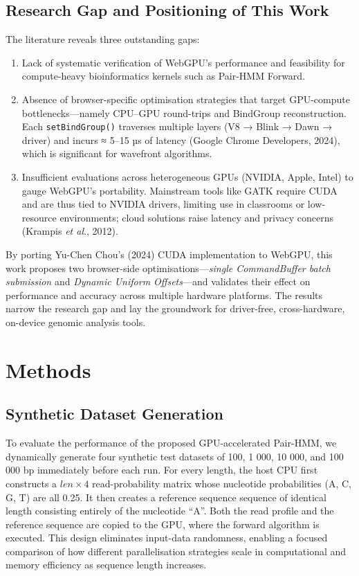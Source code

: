 \documentclass[PhD]{PHlab-thesis}
\begin{document}
\section{Research Gap and Positioning of This Work}
The literature reveals three outstanding gaps:

\begin{enumerate}
  \item Lack of systematic verification of WebGPU's performance and feasibility for compute-heavy bioinformatics kernels such as Pair-HMM Forward.
  \item Absence of browser-specific optimisation strategies that target GPU-compute bottlenecks—namely CPU–GPU round-trips and BindGroup reconstruction. Each \verb|setBindGroup()| traverses multiple layers (V8 → Blink → Dawn → driver) and incurs ≈ 5–15 µs of latency (Google Chrome Developers, 2024), which is significant for wavefront algorithms.
  \item Insufficient evaluations across heterogeneous GPUs (NVIDIA, Apple, Intel) to gauge WebGPU's portability. Mainstream tools like GATK require CUDA and are thus tied to NVIDIA drivers, limiting use in classrooms or low-resource environments; cloud solutions raise latency and privacy concerns (Krampis \emph{et al}., 2012).
\end{enumerate}

By porting Yu-Chen Chou's (2024) CUDA implementation to WebGPU, this work proposes two browser-side optimisations—\emph{single CommandBuffer batch submission} and \emph{Dynamic Uniform Offsets}—and validates their effect on performance and accuracy across multiple hardware platforms. The results narrow the research gap and lay the groundwork for driver-free, cross-hardware, on-device genomic analysis tools.





\chapter{Methods}

\section{Synthetic Dataset Generation}\label{sec:dataset}
To evaluate the performance of the proposed GPU-accelerated Pair-HMM, we
dynamically generate four synthetic test datasets of 100, 1 000, 10 000,
and 100 000 bp immediately before each run.
For every length, the host CPU first constructs a
$\textit{len}\!\times\!4$ read-probability matrix whose nucleotide
probabilities (A, C, G, T) are all 0.25.
It then creates a reference sequence sequence of identical length consisting
entirely of the nucleotide “A”.
Both the read profile and the reference sequence are copied to the GPU, where the
forward algorithm is executed.
This design eliminates input-data randomness, enabling a focused
comparison of how different parallelisation strategies scale in
computational and memory efficiency as sequence length increases.
\end{document}
